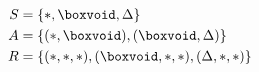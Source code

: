 \documentclass[preview]{standalone}
\begin{document}
\begin{align*}
S &= \{*, \boxvoid, \Delta\} \\
A &= \{(*, \boxvoid), (\boxvoid, \Delta)\} \\
R &= \{(*,*,*), (\boxvoid,*,*), (\Delta,*,*) \} \\
\end{align*}
\end{document}
